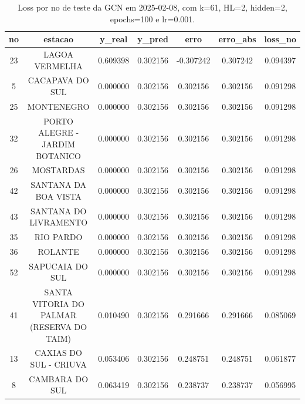 \begin{table}[h]
\centering
\caption{Loss por no de teste da GCN em 2025-02-08, com k=61, HL=2, hidden=2, epochs=100 e lr=0.001.}
\label{tab:gcn_loss_k61_hl2_h2_e100_d20250208}
\begin{tabular}{ccccccc}
\toprule
no & estacao & y\_real & y\_pred & erro & erro\_abs & loss\_no \\
\midrule
23 & LAGOA VERMELHA & 0.609398 & 0.302156 & -0.307242 & 0.307242 & 0.094397 \\
5 & CACAPAVA DO SUL & 0.000000 & 0.302156 & 0.302156 & 0.302156 & 0.091298 \\
25 & MONTENEGRO & 0.000000 & 0.302156 & 0.302156 & 0.302156 & 0.091298 \\
32 & PORTO ALEGRE - JARDIM BOTANICO & 0.000000 & 0.302156 & 0.302156 & 0.302156 & 0.091298 \\
26 & MOSTARDAS & 0.000000 & 0.302156 & 0.302156 & 0.302156 & 0.091298 \\
42 & SANTANA DA BOA VISTA & 0.000000 & 0.302156 & 0.302156 & 0.302156 & 0.091298 \\
43 & SANTANA DO LIVRAMENTO & 0.000000 & 0.302156 & 0.302156 & 0.302156 & 0.091298 \\
35 & RIO PARDO & 0.000000 & 0.302156 & 0.302156 & 0.302156 & 0.091298 \\
36 & ROLANTE & 0.000000 & 0.302156 & 0.302156 & 0.302156 & 0.091298 \\
52 & SAPUCAIA DO SUL & 0.000000 & 0.302156 & 0.302156 & 0.302156 & 0.091298 \\
41 & SANTA VITORIA DO PALMAR (RESERVA DO TAIM) & 0.010490 & 0.302156 & 0.291666 & 0.291666 & 0.085069 \\
13 & CAXIAS DO SUL - CRIUVA & 0.053406 & 0.302156 & 0.248751 & 0.248751 & 0.061877 \\
8 & CAMBARA DO SUL & 0.063419 & 0.302156 & 0.238737 & 0.238737 & 0.056995 \\
\bottomrule
\end{tabular}
\end{table}
